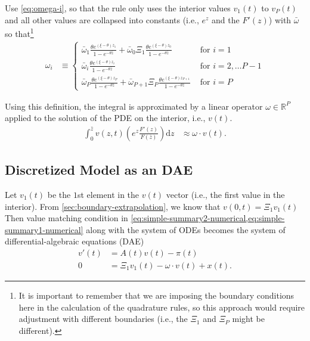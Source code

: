 \documentclass[11pt]{article}
\newcommand{\R}{\ensuremath{\mathbb{R}}}
\newcommand{\diff}{\ensuremath{\mathrm{d}}}
\begin{document}
Use \cref{eq:omega-i}, so that the rule only uses the interior values $v_1(t)$ to $v_P(t)$ and all other values are collapsed into constants (i.e., $e^z$ and the $F'(z)$) with $\bar{\omega}$ so that\footnote{It is important to remember that we are imposing the boundary conditions here in the calculation of the quadrature rules, so this approach would require adjustment with different boundaries (i.e., the $\Xi_1$ and $\Xi_P$ might be different).}
\begin{align}
\omega_i &\equiv\begin{cases}
\bar{\omega}_1 \frac{\theta e^{(\xi - \theta)z_1}}{1 - e^{-\theta \bar{z}}} + \bar{\omega}_0\Xi_1 \frac{\theta e^{(\xi - \theta)z_0}}{1 - e^{-\theta \bar{z}}}& \text{ for } i = 1\\
\bar{\omega}_i \frac{\theta e^{(\xi - \theta)z_i}}{1 - e^{-\theta \bar{z}}} & \text{ for } i = 2, \ldots P-1\\
\bar{\omega}_P \frac{\theta e^{(\xi - \theta)z_P}}{1 - e^{-\theta \bar{z}}} +  \bar{\omega}_{P+1}\Xi_P\frac{\theta e^{(\xi - \theta)z_{P+1}}}{1 - e^{-\theta \bar{z}}}& \text{ for } i = P
\end{cases}
\end{align}

\noindent Using this definition, the integral is approximated by a linear operator $\omega\in\R^P$ applied to the solution of the PDE on the interior, i.e., $v(t)$.
\begin{align}
 \int_{0}^{\bar{z}}  v(z,t) \left(e^z \frac{F'(z)}{F(\bar{z})}\right) \diff z &\approx \omega \cdot v(t) .
\end{align}

\subsection{Discretized Model as an DAE}
Let $v_1(t)$ be the $1$st element in the $v(t)$ vector (i.e., the first value in the interior).  From \cref{sec:boundary-extrapolation}, we know that $v(0, t) = \Xi_1 v_1(t)$  Then value matching condition in \cref{eq:simple-summary2-numerical,eq:simple-summary1-numerical} along with the system of ODEs becomes the system of differential-algebraic equations (DAE)
\begin{align}
	v'(t) &= A(t) v(t) - \pi(t)\label{eq:discretized-simple}\\
	0 &= \Xi_1 v_1(t) - \omega \cdot v(t) + x(t) . \label{eq:discretized-simple-vm}
\end{align}
\end{document}
